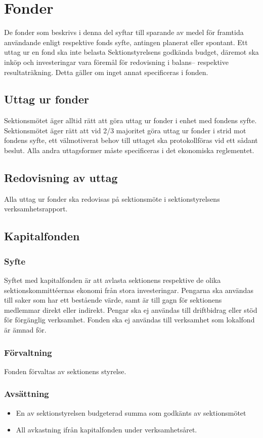 \documentclass[a4paper]{dtek}
\begin{document}
\section{Fonder}
De fonder som beskrivs i denna del syftar till sparande av medel för framtida användande enligt respektive fonds syfte, antingen planerat eller spontant. Ett uttag ur en fond ska inte belasta Sektionstyrelsens godkända budget, däremot ska inköp och investeringar vara föremål för redovisning i balans– respektive resultaträkning. Detta gäller om inget annat specificeras i fonden.

\subsection{Uttag ur fonder}
Sektionsmötet äger alltid rätt att göra uttag ur fonder i enhet med fondens syfte. Sektionsmötet äger rätt att vid 2/3 majoritet göra uttag ur fonder i strid mot fondens syfte, ett välmotiverat behov till uttaget ska protokollföras vid ett sådant beslut. Alla andra uttagsformer måste specificeras i det ekonomiska reglementet.

\subsection{Redovisning av uttag}
Alla uttag ur fonder ska redovisas på sektionsmöte i sektionstyrelsens verksamhetsrapport.

\subsection{Kapitalfonden}
\subsubsection{Syfte}
\label{sec:kapitalfond_syfte}
Syftet med kapitalfonden är att avlasta sektionens respektive de olika sektionskommittéernas ekonomi från stora investeringar. Pengarna ska användas till saker som har ett bestående värde, samt är till gagn för sektionens medlemmar direkt eller indirekt. Pengar ska ej användas till driftbidrag eller stöd för förgänglig verksamhet. Fonden ska ej användas till verksamhet som lokalfond är ämnad för.
\subsubsection{Förvaltning}
Fonden förvaltas av sektionens styrelse.
\subsubsection{Avsättning}
\begin{itemize}
\item En av sektionstyrelsen budgeterad summa som godkänts av sektionsmötet
\item All avkastning ifrån kapitalfonden under verksamhetsåret.
\end{itemize}
\end{document}
